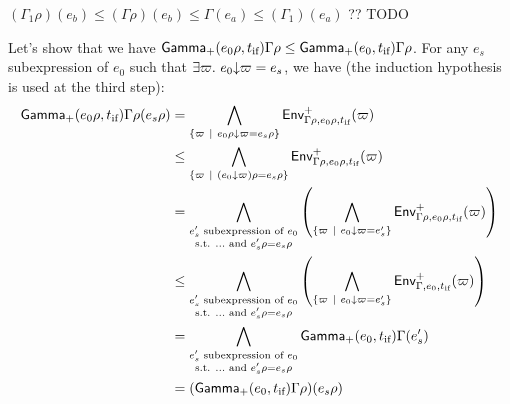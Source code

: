 \documentclass[a4paper]{article}
\theoremstyle{definition}
\begin{document}
\begin{description}
\begin{itemize}
            $(\Gamma_1\rho)(e_b) \leq (\Gamma\rho)(e_b) \leq \Gamma(e_a) \leq (\Gamma_1)(e_a)$ ?? TODO
            
    
    
            Let's show that we have $\textsf{Gamma}_{+}(e_0\rho,t_{\text{if}}) {\Gamma\rho} \leq \textsf{Gamma}_{+}(e_0,t_{\text{if}}) \Gamma \rho$.
            For any $e_s$ subexpression of $e_0$ such that $\exists \varpi.\ e_0{\downarrow}\varpi=e_s$, we have (the induction hypothesis is used at the third step):
            \begin{align*}
              \textsf{Gamma}_{+}(e_0\rho,t_{\text{if}}) {\Gamma\rho}(e_s\rho) &= \bigwedge_{\{\varpi~|~ e_0\rho{\downarrow}\varpi=e_s\rho\}} \textsf{Env}^{+}_{\Gamma\rho,e_0\rho,t_{\text{if}}} (\varpi)\\
              &\leq \bigwedge_{\{\varpi~|~ (e_0{\downarrow}\varpi)\rho=e_s\rho\}} \textsf{Env}^{+}_{\Gamma\rho,e_0\rho,t_{\text{if}}} (\varpi)\\
              &= \bigwedge_{\substack{e_s' \text{ subexpression of } e_0\\\text{s.t. } \dots \text{ and } e_s'\rho=e_s\rho}} \left(\bigwedge_{\{\varpi~|~ e_0{\downarrow}\varpi=e_s'\}} \textsf{Env}^{+}_{\Gamma\rho,e_0\rho,t_{\text{if}}} (\varpi)\right)\\
              &\leq \bigwedge_{\substack{e_s' \text{ subexpression of } e_0\\\text{s.t. } \dots \text{ and } e_s'\rho=e_s\rho}} \left(\bigwedge_{\{\varpi~|~ e_0{\downarrow}\varpi=e_s'\}} \textsf{Env}^{+}_{\Gamma,e_0,t_{\text{if}}} (\varpi)\right)\\
              &= \bigwedge_{\substack{e_s' \text{ subexpression of } e_0\\\text{s.t. } \dots \text{ and } e_s'\rho=e_s\rho}} \textsf{Gamma}_{+}(e_0,t_{\text{if}}) \Gamma (e_s')\\
              &= (\textsf{Gamma}_{+}(e_0,t_{\text{if}}) \Gamma \rho)(e_s\rho)
            \end{align*}
    
    

\end{itemize}
\end{description}
\end{document}
